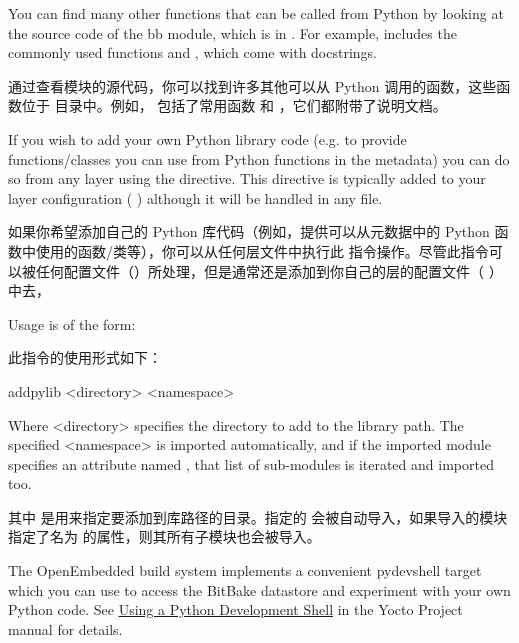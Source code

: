 
You can find many other functions that can be called from Python by looking at the source code of the bb module, which is in . For example,  includes the commonly used functions  and , which come with docstrings.

通过查看模块的源代码，你可以找到许多其他可以从 Python 调用的函数，这些函数位于  目录中。例如， 包括了常用函数 和 ，它们都附带了说明文档。

\label{section:Extending Python Library Code}

If you wish to add your own Python library code (e.g. to provide functions/classes you can use from Python functions in the metadata) you can do so from any layer using the  directive. This directive is typically added to your layer configuration ( ) although it will be handled in any  file.

如果你希望添加自己的 Python 库代码（例如，提供可以从元数据中的 Python 函数中使用的函数/类等），你可以从任何层文件中执行此  指令操作。尽管此指令可以被任何配置文件（）所处理，但是通常还是添加到你自己的层的配置文件（ ）中去，

Usage is of the form:

此指令的使用形式如下：

\begin{pyglist}
addpylib <directory> <namespace>
\end{pyglist}

Where <directory> specifies the directory to add to the library path. The specified <namespace> is imported automatically, and if the imported module specifies an attribute named , that list of sub-modules is iterated and imported too.

其中  是用来指定要添加到库路径的目录。指定的  会被自动导入，如果导入的模块指定了名为  的属性，则其所有子模块也会被导入。


The OpenEmbedded build system implements a convenient pydevshell target which you can use to access the BitBake datastore and experiment with your own Python code. See \href{https://docs.yoctoproject.org/dev-manual/python-development-shell.html#using-a-python-development-shell}{Using a Python Development Shell} in the Yocto Project manual for details.

